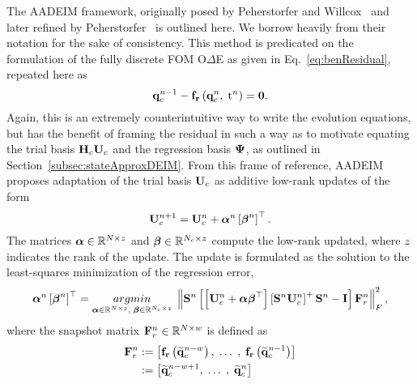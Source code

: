 The AADEIM framework, originally posed by Peherstorfer and Willcox~\cite{Peherstorfer2015} and later refined by Peherstorfer~\cite{Peherstorfer2020Adaptive} is outlined here. We borrow heavily from their notation for the sake of consistency. This method is predicated on the formulation of the fully discrete FOM O$\Delta$E as given in Eq.~\ref{eq:benResidual}, repeated here as
%
\begin{equation}
	\mathbf{q}_{c}^{n-1} - \mathbf{f}_{\mathbf{r}}\left(\mathbf{q}_{c}^{n},\; \text{t}^{n}\right) = \mathbf{0}.
\end{equation}
%
Again, this is an extremely counterintuitive way to write the evolution equations, but has the benefit of framing the residual in such a way as to motivate equating the trial basis $\consScale \consTrial$ and the regression basis $\deimBasis$, as outlined in Section~\ref{subsec:stateApproxDEIM}. From this frame of reference, AADEIM proposes adaptation of the trial basis $\consTrial$ as additive low-rank updates of the form
%
\begin{equation}
	\consTrial^{\timeIdx+1} = \consTrial^{\timeIdx} + \adeimAlpha^{\timeIdx} \left[\adeimBeta^{\timeIdx}\right]^\top.
\end{equation}
%
The matrices $\boldsymbol{\alpha} \in \mathbb{R}^{N \times z}$ and $\boldsymbol{\beta} \in \mathbb{R}^{N_c \times z}$ compute the low-rank updated, where $z$ indicates the rank of the update. The update is formulated as the solution to the least-squares minimization of the regression error,
%
\begin{equation}\label{eq:aadeimAlphaBeta}
	\adeimAlpha^{\timeIdx} \left[\adeimBeta^{\timeIdx}\right]^\top = \argmin{\adeimAlpha \inRTwo{\numDOF}{\numRank},\; \adeimBeta \inRTwo{\numConsModes}{\numRank}} \left\Vert \sampMat^{\timeIdx} \left[\left[\consTrial^{\timeIdx} + \adeimAlpha \adeimBeta^\top \right] \left[\sampMat^{\timeIdx} \consTrial^{\timeIdx}\right]^+ \sampMat^{\timeIdx} - \identMat \right] \resWindow^{\timeIdx} \right\Vert_F^2,
\end{equation}
%
where the snapshot matrix $\resWindow^{\timeIdx} \inRTwo{\numDOF}{\numWindow}$ is defined as
%
\begin{align}
	\resWindow^{\timeIdx} &\defEq \left[\rhsResFunc{\consVecRom^{\timeIdx - \numWindow}}, \; \hdots \;, \; \rhsResFunc{\consVecRom^{\timeIdx - 1}}\right] \\
	&\defEq \left[\consVecRom^{\timeIdx - \numWindow + 1}, \; \hdots \;, \; \consVecRom^{\timeIdx} \right]
\end{align}
%
